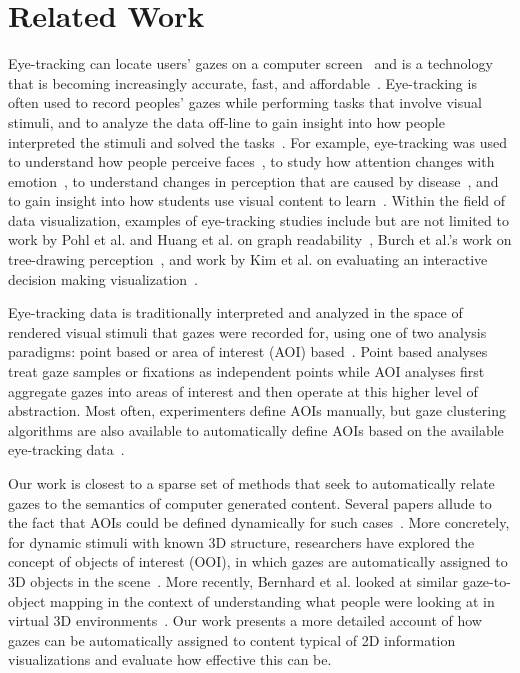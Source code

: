 \section{Related Work}
Eye-tracking can locate users' gazes on a computer screen~\cite{ware1987evaluation, jacob1991use} and is a technology that is becoming increasingly accurate, fast, and affordable~\cite{duchowski2007eye, sesma2012evaluation}. Eye-tracking is often used to record peoples' gazes while performing tasks that involve visual stimuli, and to analyze the data off-line to gain insight into how people interpreted the stimuli and solved the tasks~\cite{duchowski2007eye}. For example, eye-tracking was used to understand how people perceive faces~\cite{guo2014perceiving,shasteen2014eye}, to study how attention changes with emotion~\cite{vervoort2013attentional}, to understand changes in perception that are caused by disease~\cite{kim2014investigating}, and to gain insight into how students use visual content to learn~\cite{zawoyski2014using,mayer2010unique,van2010eye,conati2013eye}. Within the field of data visualization, examples of eye-tracking studies include but are not limited to work by Pohl et al. and Huang et al. on graph readability~\cite{pohl2009comparing,huang2008beyond,huang2005people}, Burch et al.'s work on tree-drawing perception~\cite{burch2011evaluation,burch2013visual}, and work by Kim et al. on evaluating an interactive decision making visualization~\cite{kim2012does}.
 
Eye-tracking data is traditionally interpreted and analyzed in the space of rendered visual stimuli that gazes were recorded for, using one of two analysis paradigms: point based or area of interest (AOI) based~\cite{blascheckstate}. Point based analyses treat gaze samples or fixations as independent points while AOI analyses first aggregate gazes into areas of interest and then operate at this higher level of abstraction. Most often, experimenters define AOIs manually, but gaze clustering algorithms are also available to automatically define AOIs based on the available eye-tracking data~\cite{privitera2000algorithms,santella2004robust,drusch2014analysing}. 

Our work is closest to a sparse set of methods that seek to automatically relate gazes to the semantics of computer generated content. Several papers allude to the fact that AOIs could be defined dynamically for such cases~\cite{steichen2013user,kurzhals2014iseecube}. More concretely, for dynamic stimuli with known 3D structure, researchers have explored the concept of objects of interest (OOI), in which gazes are automatically assigned to 3D objects in the scene~\cite{stellmach20103d}. More recently, Bernhard et al. looked at similar gaze-to-object mapping in the context of understanding what people were looking at in virtual 3D environments~\cite{bernhard2014gaze}. Our work presents a more detailed account of how gazes can be automatically assigned to content typical of 2D information visualizations and evaluate how effective this can be.
 
